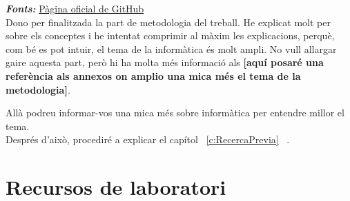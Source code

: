 \textit{\textbf{Fonts:}} \href{https://github.com/resources/articles/software-development/what-is-version-control?utm_source=chatgpt.com}{Pàgina oficial de GitHub}\\


Dono per finalitzada la part de metodologia del treball. He explicat molt per sobre els conceptes i he intentat comprimir al màxim les explicacions, perquè, com bé es pot intuir, el tema de la informàtica és molt ampli. No vull allargar gaire aquesta part, però hi ha molta més informació als \textbf{[aquí posaré una referència als annexos on amplio una mica més el tema de la metodologia]}.

Allà podreu informar-vos una mica més sobre informàtica per entendre millor el tema.\\

Després d’això, procediré a explicar el capítol ~\ref{c:RecercaPrevia} ~.

\section{Recursos de laboratori}


